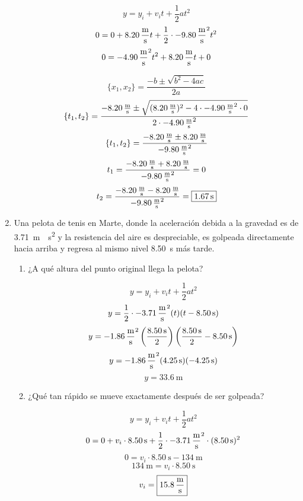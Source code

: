 \documentclass[Física - Práctica.root.tex]{subfiles}
\begin{document}
\begin{enumerate}
        \[y=y_i+v_it+\frac{1}{2}at^2\]
        \[0=0+\SI{8,20}{\meter\over\second}t+\frac{1}{2}\cdot\SI{-9,80}{\meter\over\second\squared}t^2\]
        \[0=-\SI{4,90}{\meter\over\second\squared}t^2+\SI{8,20}{\meter\over\second}t+0\]

        \[\{x_1,x_2\}=\frac{-b\pm\sqrt{b^2-4ac}}{2a}\]
        \[\{t_1,t_2\}=\frac{\SI{-8,20}{\meter\over\second}\pm\sqrt{(\SI{8,20}{\meter\over\second})^2-4\cdot-\SI{4,90}{\meter\over\second\squared}\cdot 0}}{2\cdot-\SI{4,90}{\meter\over\second\squared}}\]
        \[\{t_1,t_2\}=\frac{\SI{-8,20}{\meter\over\second}\pm\SI{8,20}{\meter\over\second}}{-\SI{9,80}{\meter\over\second\squared}}\]
        \[t_1=\frac{\SI{-8,20}{\meter\over\second}+\SI{8,20}{\meter\over\second}}{-\SI{9,80}{\meter\over\second\squared}}=0\]
        \[t_2=\frac{\SI{-8,20}{\meter\over\second}-\SI{8,20}{\meter\over\second}}{-\SI{9,80}{\meter\over\second\squared}}=\boxed{\SI{1,67}{\second}}\]

  \item Una pelota de tenis en Marte, donde la aceleración debida a la gravedad es de \SI{3,71}{\meter\over\second\squared} y la resistencia del aire es despreciable, es golpeada directamente hacia arriba y regresa al mismo nivel \SI{8,50}{\second} más tarde.

        \begin{enumerate}
          \item ¿A qué altura del punto original llega la pelota?

                \[y=y_i+v_it+\frac{1}{2}at^2\]
                \[y=\frac{1}{2}\cdot\SI{-3,71}{\meter\over\second\squared}(t)(t-\SI{8,50}{\second})\]
                \[y=\SI{-1,86}{\meter\over\second\squared}\left(\frac{\SI{8,50}{\second}}{2}\right)\left(\frac{\SI{8,50}{\second}}{2}-\SI{8,50}{\second}\right)\]
                \[y=\SI{-1,86}{\meter\over\second\squared}(\SI{4,25}{\second})(\SI{-4,25}{\second})\]
                \[y=\boxed{\SI{33,6}{\meter}}\]

          \item ¿Qué tan rápido se mueve exactamente después de ser golpeada?

                \[y=y_i+v_it+\frac{1}{2}at^2\]
                \[0=0+v_i\cdot\SI{8,50}{\second}+\frac{1}{2}\cdot\SI{-3,71}{\meter\over\second\squared}\cdot(\SI{8,50}{\second})^2\]
                \[0=v_i\cdot\SI{8,50}{\second}-\SI{134}{\meter}\]
                \[\SI{134}{\meter}=v_i\cdot\SI{8,50}{\second}\]
                \[v_i=\boxed{\SI{15,8}{\meter\over\second}}\]
        \end{enumerate}


\end{enumerate}
\end{document}
